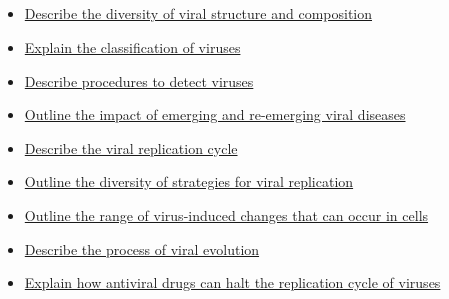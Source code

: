 \documentclass[10pt, a4paper]{article}
\begin{document}
\subsection{} \begin{itemize} \item \href{https://www.notion.so/cc600dd4cdf648dda0e83d8048712674}{Describe the diversity of viral structure and composition } \item \href{https://www.notion.so/1e8d041eb52a4639ab73240720256df1}{Explain the classification of viruses} \item \href{https://www.notion.so/308d5940136740a78c86fe4da107c56a}{Describe procedures to detect viruses } \item \href{https://www.notion.so/c4588f2a9fe940b698d4b5c7083f8262}{Outline the impact of emerging and re-emerging viral diseases} \item \href{https://www.notion.so/57d4a99af07a4635b3e1ff624d4ce4d9}{Describe the viral replication cycle} \item \href{https://www.notion.so/0227329d90454d20b92d3380dfbf00e8}{Outline the diversity of strategies for viral replication} \item \href{https://www.notion.so/f711c2fbea1a45168d317ff8dc8763d6}{Outline the range of virus-induced changes that can occur in cells} \item \href{https://www.notion.so/b0f5836f4152406ea3fd4a84e287ed19}{Describe the process of viral evolution} \item \href{https://www.notion.so/17410b73286e48e5ab8059aa902376ab}{Explain how antiviral drugs can halt the replication cycle of viruses} \end{itemize}
\end{document}
